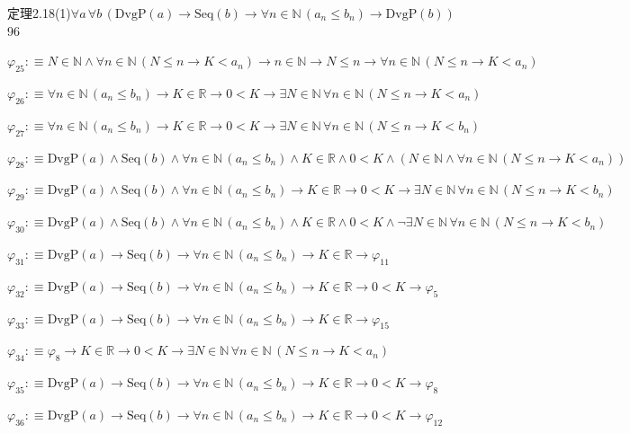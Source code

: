 \begin{fullproof}{定理2.18(1)}{$\forall a\,\forall b\,(\mathrm{DvgP}(a) \to \mathrm{Seq}(b) \to \forall n \in \mathbb{N}\,(a_{n} \leq b_{n}) \to \mathrm{DvgP}(b))$}{96}
\begin{abbrevlist}
\item $\varphi_{25} :\equiv N \in \mathbb{N} \land \forall n \in \mathbb{N}\,(N \leq n \to K < a_{n}) \to n \in \mathbb{N} \to N \leq n \to \forall n \in \mathbb{N}\,(N \leq n \to K < a_{n})$
\item $\varphi_{26} :\equiv \forall n \in \mathbb{N}\,(a_{n} \leq b_{n}) \to K \in \mathbb{R} \to 0 < K \to \exists N \in \mathbb{N}\,\forall n \in \mathbb{N}\,(N \leq n \to K < a_{n})$
\item $\varphi_{27} :\equiv \forall n \in \mathbb{N}\,(a_{n} \leq b_{n}) \to K \in \mathbb{R} \to 0 < K \to \exists N \in \mathbb{N}\,\forall n \in \mathbb{N}\,(N \leq n \to K < b_{n})$
\item $\varphi_{28} :\equiv \mathrm{DvgP}(a) \land \mathrm{Seq}(b) \land \forall n \in \mathbb{N}\,(a_{n} \leq b_{n}) \land K \in \mathbb{R} \land 0 < K \land (N \in \mathbb{N} \land \forall n \in \mathbb{N}\,(N \leq n \to K < a_{n}))$
\item $\varphi_{29} :\equiv \mathrm{DvgP}(a) \land \mathrm{Seq}(b) \land \forall n \in \mathbb{N}\,(a_{n} \leq b_{n}) \to K \in \mathbb{R} \to 0 < K \to \exists N \in \mathbb{N}\,\forall n \in \mathbb{N}\,(N \leq n \to K < b_{n})$
\item $\varphi_{30} :\equiv \mathrm{DvgP}(a) \land \mathrm{Seq}(b) \land \forall n \in \mathbb{N}\,(a_{n} \leq b_{n}) \land K \in \mathbb{R} \land 0 < K \land \neg \exists N \in \mathbb{N}\,\forall n \in \mathbb{N}\,(N \leq n \to K < b_{n})$
\item $\varphi_{31} :\equiv \mathrm{DvgP}(a) \to \mathrm{Seq}(b) \to \forall n \in \mathbb{N}\,(a_{n} \leq b_{n}) \to K \in \mathbb{R} \to \varphi_{11}$
\item $\varphi_{32} :\equiv \mathrm{DvgP}(a) \to \mathrm{Seq}(b) \to \forall n \in \mathbb{N}\,(a_{n} \leq b_{n}) \to K \in \mathbb{R} \to 0 < K \to \varphi_{5}$
\item $\varphi_{33} :\equiv \mathrm{DvgP}(a) \to \mathrm{Seq}(b) \to \forall n \in \mathbb{N}\,(a_{n} \leq b_{n}) \to K \in \mathbb{R} \to \varphi_{15}$
\item $\varphi_{34} :\equiv \varphi_{8} \to K \in \mathbb{R} \to 0 < K \to \exists N \in \mathbb{N}\,\forall n \in \mathbb{N}\,(N \leq n \to K < a_{n})$
\item $\varphi_{35} :\equiv \mathrm{DvgP}(a) \to \mathrm{Seq}(b) \to \forall n \in \mathbb{N}\,(a_{n} \leq b_{n}) \to K \in \mathbb{R} \to 0 < K \to \varphi_{8}$
\item $\varphi_{36} :\equiv \mathrm{DvgP}(a) \to \mathrm{Seq}(b) \to \forall n \in \mathbb{N}\,(a_{n} \leq b_{n}) \to K \in \mathbb{R} \to 0 < K \to \varphi_{12}$

\end{abbrevlist}
\end{fullproof}
